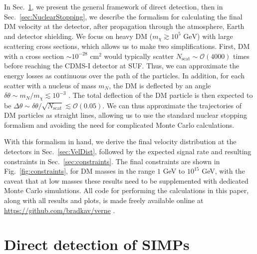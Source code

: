 \documentclass[prd,twocolumn,showpacs,nofootinbib,aps]{revtex4-1}
\begin{document}
In Sec.~\ref{sec:DirectDetection}, we present the general framework of direct detection, then in Sec.~\ref{sec:NuclearStopping}, we describe the formalism for calculating the final DM velocity at the detector, after propagation through the atmosphere, Earth and detector shielding. We focus on heavy DM ($m_\chi \gtrsim 10^5 \,\,\mathrm{GeV}$) with large scattering cross sections, which allows us to make two simplifications. First, DM with a cross section $\sim 10^{-28}\,\,\mathrm{cm}^2$ would typically scatter $N_\mathrm{scat}\sim\mathcal{O}(4000)$ times before reaching the CDMS-I detector at SUF. Thus, we can approximate the energy losses as continuous over the path of the particles. In addition, for each scatter with a nucleus of mass $m_N$, the DM is deflected by an angle $\delta \theta \sim m_N/m_\chi \lesssim 10^{-3}$ \cite{Kavanagh:2016pyr}. The total deflection of the DM particle is then expected to be $\Delta \theta \sim \delta \theta/\sqrt{N_\mathrm{scat}} \lesssim \mathcal{O}(0.05)$. We can thus approximate the trajectories of DM particles as straight lines, allowing us to use the standard nuclear stopping formalism and avoiding the need for complicated Monte Carlo calculations.

With this formalism in hand, we derive the final velocity distribution at the detectors in Sec.~\ref{sec:VelDist}, followed by the expected signal rate and resulting constraints in Sec.~\ref{sec:constraints}. The final constraints are shown in Fig.~\ref{fig:constraints}, for DM masses in the range $1$ GeV to $10^{15}$ GeV, with the caveat that at low masses these results need to be supplemented with dedicated Monte Carlo simulations. All code for performing the calculations in this paper, along with all results and plots, is made freely available online at \href{https://github.com/bradkav/verne}{https://github.com/bradkav/verne} \cite{verne}.


\section{Direct detection of SIMPs}
\label{sec:DirectDetection}
\end{document}
